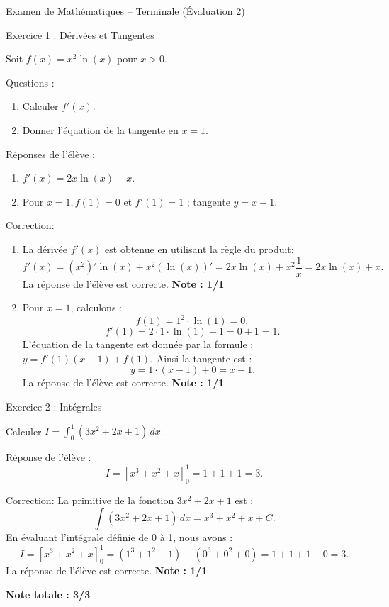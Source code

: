 \documentclass{article}
\begin{document}
Examen de Mathématiques – Terminale (Évaluation 2)

Exercice 1 : Dérivées et Tangentes

Soit \( f(x) = x^2 \ln(x) \) pour \( x > 0 \).

Questions :
\begin{enumerate}
    \item Calculer \( f'(x) \).
    \item Donner l’équation de la tangente en \( x = 1 \).
\end{enumerate}

Réponses de l’élève :
\begin{enumerate}
    \item \( f'(x) = 2x \ln(x) + x \).
    \item Pour \( x = 1, f(1) = 0 \) et \( f'(1) = 1 \) ; tangente \( y = x - 1 \).
\end{enumerate}

Correction:
\begin{enumerate}
    \item La dérivée \( f'(x) \) est obtenue en utilisant la règle du produit: 
    \[
    f'(x) = (x^2)' \ln(x) + x^2 (\ln(x))' = 2x \ln(x) + x^2 \frac{1}{x} = 2x \ln(x) + x.
    \]
    La réponse de l'élève est correcte. \textbf{Note : 1/1}
    
    \item Pour \( x = 1 \), calculons :
    \[
    f(1) = 1^2 \cdot \ln(1) = 0,
    \]
    \[
    f'(1) = 2 \cdot 1 \cdot \ln(1) + 1 = 0 + 1 = 1.
    \]
    L'équation de la tangente est donnée par la formule : \( y = f'(1)(x - 1) + f(1) \). Ainsi la tangente est :
    \[
    y = 1 \cdot (x - 1) + 0 = x - 1.
    \]
    La réponse de l'élève est correcte. \textbf{Note : 1/1}
\end{enumerate}

Exercice 2 : Intégrales

Calculer \( I = \int_{0}^{1} (3x^2 + 2x + 1) \, dx \).

Réponse de l’élève :
\[
I = \left[ x^3 + x^2 + x \right]_{0}^{1} = 1 + 1 + 1 = 3.
\]

Correction:
La primitive de la fonction \( 3x^2 + 2x + 1 \) est :
\[
\int (3x^2 + 2x + 1) \, dx = x^3 + x^2 + x + C.
\]
En évaluant l'intégrale définie de 0 à 1, nous avons :
\[
I = \left[ x^3 + x^2 + x \right]_{0}^{1} = \left(1^3 + 1^2 + 1\right) - \left(0^3 + 0^2 + 0\right) = 1 + 1 + 1 - 0 = 3.
\]
La réponse de l'élève est correcte. \textbf{Note : 1/1}

\bigskip

\textbf{Note totale : 3/3}
\end{document}

